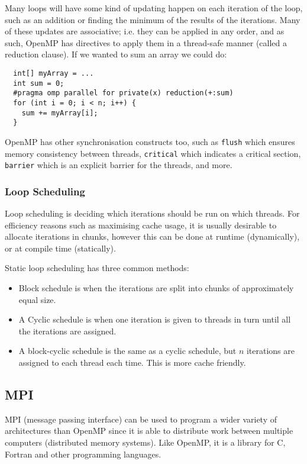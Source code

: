 Many loops will have some kind of updating happen on each iteration of
the loop, such as an addition or finding the minimum of the results of
the iterations. Many of these updates are associative; i.e. they can
be applied in any order, and as such, OpenMP has directives to apply
them in a thread-safe manner (called a reduction clause). If we wanted
to sum an array we could do:

\begin{verbatim}
  int[] myArray = ...
  int sum = 0;
  #pragma omp parallel for private(x) reduction(+:sum)
  for (int i = 0; i < n; i++) {
    sum += myArray[i];
  }
\end{verbatim}

OpenMP has other synchronisation constructs too, such
as \texttt{flush} which ensures memory consistency between
threads, \texttt{critical} which indicates a critical
section, \texttt{barrier} which is an explicit barrier for the
threads, and more.

\subsubsection{Loop Scheduling}

Loop scheduling is deciding which iterations should be run on which
threads. For efficiency reasons such as maximising cache usage, it is
usually desirable to allocate iterations in chunks, however this can
be done at runtime (dynamically), or at compile time
(statically).

Static loop scheduling has three common methods:

\begin{itemize}
\item Block schedule is when the iterations are split into chunks of
approximately equal size.
\item A Cyclic schedule is when one iteration is given to threads in
turn until all the iterations are assigned.
\item A block-cyclic schedule is the same as a cyclic schedule, but
$n$ iterations are assigned to each thread each time. This is more
cache friendly.
\end{itemize}

\subsection{MPI}

MPI (message passing interface) can be used to program a wider variety of architectures than
OpenMP since it is able to distribute work between multiple computers
(distributed memory systems). Like OpenMP, it is a library for C,
Fortran and other programming languages.


